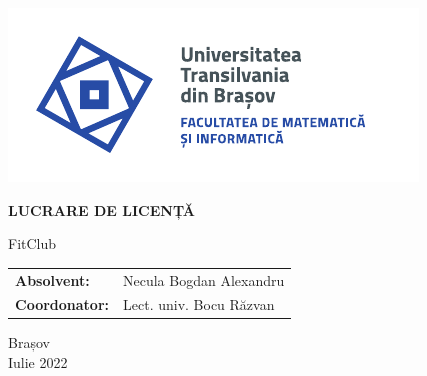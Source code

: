 \begin{titlepage}
	
	\vspace*{-3cm}
	\hspace{-2cm}
	\includegraphics[width=0.8\linewidth]{./images/Logo-UT-MI-SPOT-RO}
	
		\begin{center}
		\Huge
		
		\vspace{2cm}
		
		\textbf{LUCRARE DE LICENȚĂ}
		
		\vspace{1cm}
		
		\LARGE
		FitClub
		
		\vfill
		
		\Large
		\begin{tabular}{ll}
			\textbf{Absolvent:}&Necula Bogdan Alexandru\\
			\textbf{Coordonator:}&Lect. univ. Bocu Răzvan\\
		\end{tabular}
		
		\vfill
		
		\Large
		Brașov\\
		Iulie 2022
		
	\end{center}
\end{titlepage}